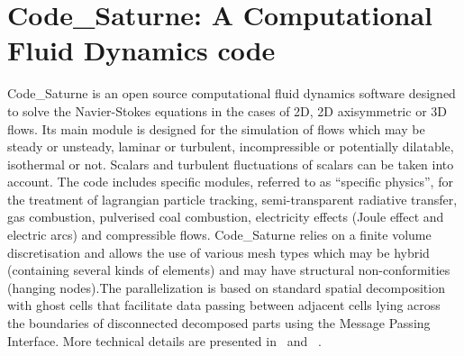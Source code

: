 \section{Code\_Saturne: A Computational Fluid Dynamics code}
\label{sec:cs}
Code\_Saturne is an open source computational fluid dynamics software designed
to solve the Navier-Stokes equations in the cases of 2D, 2D axisymmetric or 3D
flows. Its main module is designed for the simulation of flows which may be
steady or unsteady, laminar or turbulent, incompressible or potentially
dilatable, isothermal or not. Scalars and turbulent fluctuations of scalars can
be taken into account. The code includes specific modules, referred to as
“specific physics”, for the treatment of lagrangian particle tracking,
semi-transparent radiative transfer, gas combustion, pulverised coal
combustion, electricity effects (Joule effect and electric arcs) and
compressible flows. Code\_Saturne relies on a finite volume discretisation and
allows the use of various mesh types which may be hybrid (containing several
kinds of elements) and may have structural non-conformities (hanging nodes).The
parallelization is based on standard spatial decomposition with ghost cells
that facilitate data passing between adjacent cells lying across the boundaries
of disconnected decomposed parts using the Message Passing Interface. More
technical details are presented in~\cite{cs2004} and ~\cite{userguide}.

